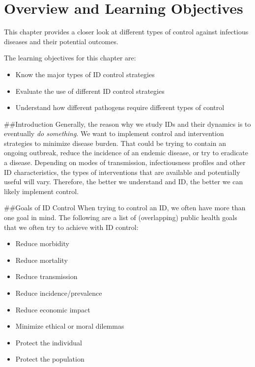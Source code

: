 \documentclass[]{book}
\providecommand{\tightlist}{%
  \setlength{\itemsep}{0pt}\setlength{\parskip}{0pt}}
\theoremstyle{definition}
\theoremstyle{definition}
\theoremstyle{definition}
\theoremstyle{remark}
\begin{document}
\hypertarget{overview-and-learning-objectives-8}{%
\section{Overview and Learning
Objectives}\label{overview-and-learning-objectives-8}}

This chapter provides a closer look at different types of control
against infectious diseases and their potential outcomes.

The learning objectives for this chapter are:

\begin{itemize}
\tightlist
\item
  Know the major types of ID control strategies
\item
  Evaluate the use of different ID control strategies
\item
  Understand how different pathogens require different types of control
\end{itemize}

\#\#Introduction Generally, the reason why we study IDs and their
dynamics is to eventually \emph{do something}. We want to implement
control and intervention strategies to minimize disease burden. That
could be trying to contain an ongoing outbreak, reduce the incidence of
an endemic disease, or try to eradicate a disease. Depending on modes of
transmission, infectiousness profiles and other ID characteristics, the
types of interventions that are available and potentially useful will
vary. Therefore, the better we understand and ID, the better we can
likely implement control.

\#\#Goals of ID Control When trying to control an ID, we often have more
than one goal in mind. The following are a list of (overlapping) public
health goals that we often try to achieve with ID control:

\begin{itemize}
\tightlist
\item
  Reduce morbidity
\item
  Reduce mortality
\item
  Reduce transmission
\item
  Reduce incidence/prevalence
\item
  Reduce economic impact
\item
  Minimize ethical or moral dilemmas
\item
  Protect the individual
\item
  Protect the population
\end{itemize}
\end{document}
